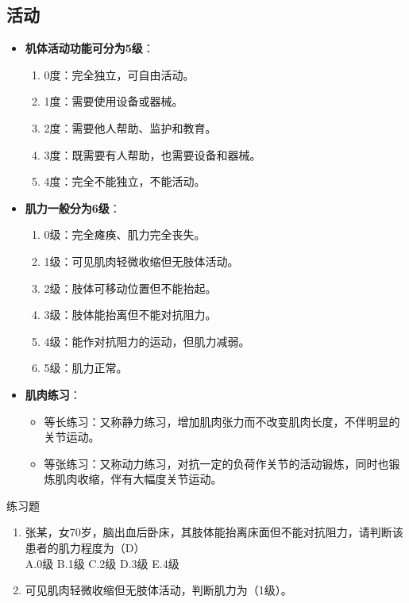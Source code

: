 \documentclass[11pt, a4paper]{ctexart}
\begin{document}
\subsection{活动}
\begin{itemize}
    \item \textbf{机体活动功能可分为5级}：
    \begin{enumerate}
        \item 0度：完全独立，可自由活动。
        \item 1度：需要使用设备或器械。
        \item 2度：需要他人帮助、监护和教育。
        \item 3度：既需要有人帮助，也需要设备和器械。
        \item 4度：完全不能独立，不能活动。
    \end{enumerate}
    \item \textbf{肌力一般分为6级}：
    \begin{enumerate}
        \item 0级：完全瘫痪、肌力完全丧失。
        \item 1级：可见肌肉轻微收缩但无肢体活动。
        \item 2级：肢体可移动位置但不能抬起。
        \item 3级：肢体能抬离但不能对抗阻力。
        \item 4级：能作对抗阻力的运动，但肌力减弱。
        \item 5级：肌力正常。
    \end{enumerate}
    \item \textbf{肌肉练习}：
    \begin{itemize}
        \item 等长练习：又称静力练习，增加肌肉张力而不改变肌肉长度，不伴明显的关节运动。
        \item 等张练习：又称动力练习，对抗一定的负荷作关节的活动锻炼，同时也锻炼肌肉收缩，伴有大幅度关节运动。
    \end{itemize}
\end{itemize}

\begin{examplebox}{练习题}
\begin{enumerate}
    \item 张某，女70岁，脑出血后卧床，其肢体能抬离床面但不能对抗阻力，请判断该患者的肌力程度为（D）\\
    A.0级 \quad B.1级 \quad C.2级 \quad D.3级 \quad E.4级
    \item 可见肌肉轻微收缩但无肢体活动，判断肌力为（1级）。
\end{enumerate}
\end{examplebox}
\end{document}
